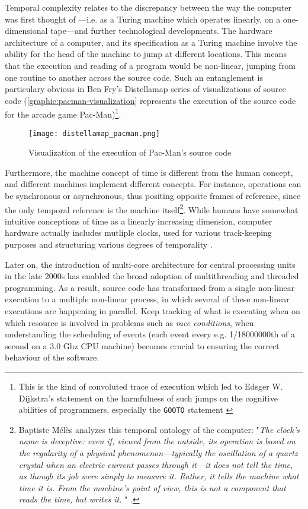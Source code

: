 Temporal complexity relates to the discrepancy between the way the computer was first thought of —i.e. as a Turing machine which operates linearly, on a one-dimensional tape—and further technological developments. The hardware architecture of a computer, and its specification as a Turing machine involve the ability for the head of the machine to jump at different locations. This means that the execution and reading of a program would be non-linear, jumping from one routine to another across the source code. Such an entanglement is particulary obvious in Ben Fry's Distellamap series of visualizations of source code (\autoref{graphic:pacman-visualization} represents the execution of the source code for the arcade game Pac-Man)\footnote{This is the kind of convoluted trace of execution which led to Edsger W. Dijkstra's statement on the harmfulness of such jumps on the cognitive abilities of programmers, especially the \lstinline{GOOTO} statement \cite{dijkstra_letters_1968}}.

\begin{figure}
    \texttt{[image: distellamap\_pacman.png]}
    \caption{Visualization of the execution of Pac-Man's source code}
    \label{graphic:pacman-visualization}
\end{figure}

Furthermore, the machine concept of time is different from the human concept, and different machines implement different concepts. For instance, operations can be synchronous or asynchronous, thus positing opposite frames of reference, since the only temporal reference is the machine itself\footnote{Baptiste Mélès analyzes this temporal ontology of the computer: "\emph{The clock's name is deceptive: even if, viewed from the outside, its operation is based on the regularity of a physical phenomenon—typically the oscillation of a quartz crystal when an electric current passes through it—it does not tell the time, as though its job were simply to measure it. Rather, it tells the machine what time it is. From the machine's point of view, this is not a component that \emph{reads} the time, but \emph{writes} it. }" \citep{meles_time_2017}.}. While humans have somewhat intuitive conceptions of time as a linearly increasing dimension, computer hardware actually includes mutliple clocks, used for various track-keeping purposes and structuring various degrees of temporality \citep{meles_time_2017}.

Later on, the introduction of multi-core architecture for central processing units in the late 2000s has enabled the broad adoption of multithreading and threaded programming. As a result, source code has transformed from a single non-linear execution to a multiple non-linear process, in which several of these non-linear executions are happening in parallel. Keep tracking of what is executing when on which resource is involved in problems such as \emph{race conditions}, when understanding the scheduling of events (each event every e.g. 1/18000000th of a second on a 3.0 Ghz CPU machine) becomes crucial to ensuring the correct behaviour of the software.


